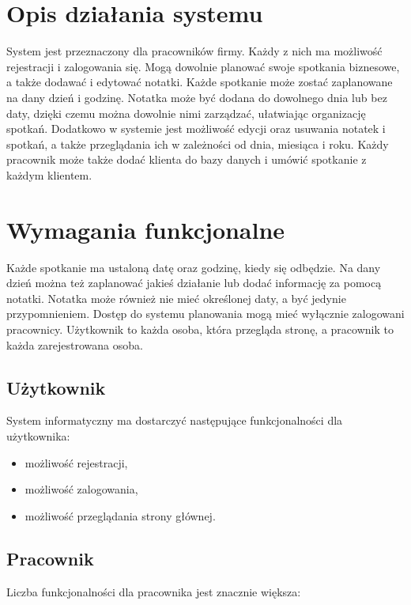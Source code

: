 \documentclass[eng,printmode,openany,oneside]{mgr}
\begin{document}
\section{Opis działania systemu}
System jest przeznaczony dla pracowników firmy. Każdy z nich ma możliwość rejestracji i zalogowania się. Mogą dowolnie planować swoje spotkania biznesowe, a także dodawać i edytować notatki. Każde spotkanie może zostać zaplanowane na dany dzień i godzinę. Notatka może być dodana do dowolnego dnia lub bez daty, dzięki czemu można dowolnie nimi zarządzać, ułatwiając organizację spotkań. Dodatkowo w systemie jest możliwość edycji oraz usuwania notatek i spotkań, a także przeglądania ich w zależności od dnia, miesiąca i roku. Każdy pracownik może także dodać klienta do bazy danych i umówić spotkanie z każdym klientem.

\section{Wymagania funkcjonalne}
Każde spotkanie ma ustaloną datę oraz godzinę, kiedy się odbędzie. Na dany dzień można też zaplanować jakieś działanie lub dodać informację za pomocą notatki. Notatka może również nie mieć określonej daty, a być jedynie przypomnieniem. Dostęp do systemu planowania mogą mieć wyłącznie zalogowani pracownicy. Użytkownik to każda osoba, która przegląda stronę, a pracownik to każda zarejestrowana osoba.

\subsection*{Użytkownik}
System informatyczny ma dostarczyć następujące funkcjonalności dla użytkownika:


\begin{itemize}
	\item możliwość rejestracji,
	\item możliwość zalogowania,
	\item możliwość przeglądania strony głównej.
\end{itemize}


\subsection*{Pracownik}
Liczba funkcjonalności dla pracownika jest znacznie większa:
\end{document}
